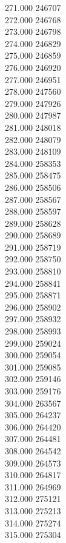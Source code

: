 { 271.000	246707 \\
 272.000	246768 \\
 273.000	246798 \\
 274.000	246829 \\
 275.000	246859 \\
 276.000	246920 \\
 277.000	246951 \\
 278.000	247560 \\
 279.000	247926 \\
 280.000	247987 \\
 281.000	248018 \\
 282.000	248079 \\
 283.000	248109 \\
 284.000	258353 \\
 285.000	258475 \\
 286.000	258506 \\
 287.000	258567 \\
 288.000	258597 \\
 289.000	258628 \\
 290.000	258689 \\
 291.000	258719 \\
 292.000	258750 \\
 293.000	258810 \\
 294.000	258841 \\
 295.000	258871 \\
 296.000	258902 \\
 297.000	258932 \\
 298.000	258993 \\
 299.000	259024 \\
 300.000	259054 \\
 301.000	259085 \\
 302.000	259146 \\
 303.000	259176 \\
 304.000	263567 \\
 305.000	264237 \\
 306.000	264420 \\
 307.000	264481 \\
 308.000	264542 \\
 309.000	264573 \\
 310.000	264817 \\
 311.000	264969 \\
 312.000	275121 \\
 313.000	275213 \\
 314.000	275274 \\
 315.000	275304 \\
}
